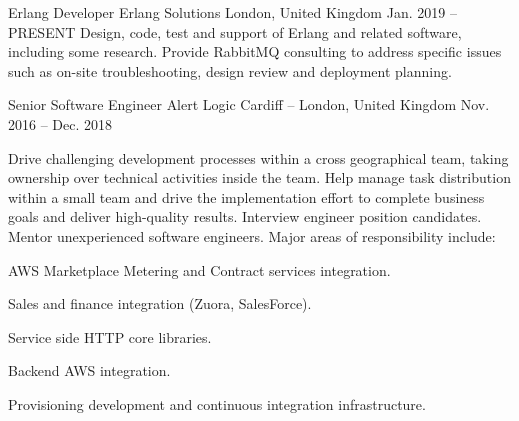 

\begin{cventries}

  \cventry
    {Erlang Developer} %
    {Erlang Solutions} %
    {London, United Kingdom} %
    {Jan. 2019 – PRESENT} %
    {
      \responsibilities
        {Design, code, test and support of Erlang and related
        software, including some research. Provide RabbitMQ consulting to
        address specific issues such as on-site troubleshooting, design review
        and deployment planning.}
    }

  \cventry
    {Senior Software Engineer} %
    {Alert Logic} %
    {Cardiff -- London, United Kingdom} %
    {Nov. 2016 – Dec. 2018} %
    {
      \responsibilities
        {Drive challenging development processes within a cross
        geographical team, taking ownership over technical activities
        inside the team. Help manage task distribution within a small
        team and drive the implementation effort to complete business
        goals and deliver high-quality results. Interview engineer
        position candidates. Mentor unexperienced software
        engineers. Major areas of responsibility include:}
      \begin{cvitems} %
        \item {AWS Marketplace Metering and Contract services integration.}
        \item {Sales and finance integration (Zuora, SalesForce).}
        \item {Service side HTTP core libraries.}
        \item {Backend AWS integration.}
        \item {Provisioning development and continuous integration infrastructure.}
      \end{cvitems}
    }


\end{cventries}
